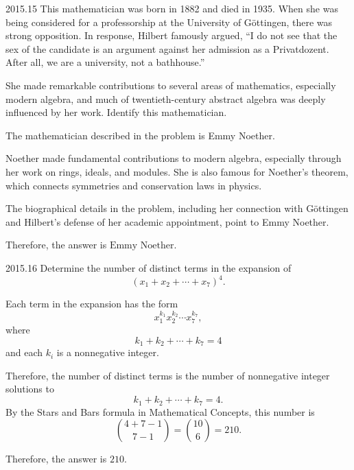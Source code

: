     \begin{pastproblem}{2015.15}
        This mathematician was born in 1882 and died in 1935. When she was being considered for a
        professorship at the University of Göttingen, there was strong opposition. In response,
        Hilbert famously argued, ``I do not see that the sex of the candidate is an argument against
        her admission as a Privatdozent. After all, we are a university, not a bathhouse.''

        She made remarkable contributions to several areas of mathematics, especially modern
        algebra, and much of twentieth-century abstract algebra was deeply influenced by her work.
        Identify this mathematician.
    \end{pastproblem}

    \begin{solution}
        The mathematician described in the problem is Emmy Noether.

        Noether made fundamental contributions to modern algebra, especially through her work on
        rings, ideals, and modules. She is also famous for Noether's theorem, which connects
        symmetries and conservation laws in physics.

        The biographical details in the problem, including her connection with Göttingen and
        Hilbert's defense of her academic appointment, point to Emmy Noether.

        Therefore, the answer is $\boxed{\text{Emmy Noether}}$.
    \end{solution}

    \begin{pastproblem}{2015.16}
        Determine the number of distinct terms in the expansion of
        \[
            (x_1+x_2+\cdots+x_7)^4.
        \]
    \end{pastproblem}

    \begin{solution}
        Each term in the expansion has the form
        \[
            x_1^{k_1}x_2^{k_2}\cdots x_7^{k_7},
        \]
        where
        \[
            k_1+k_2+\cdots+k_7=4
        \]
        and each $k_i$ is a nonnegative integer.

        Therefore, the number of distinct terms is the number of nonnegative integer solutions to
        \[
            k_1+k_2+\cdots+k_7=4.
        \]
        By the Stars and Bars formula in Mathematical Concepts, this number is
        \[
            \binom{4+7-1}{7-1}
            =
            \binom{10}{6}
            =
            210.
        \]

        Therefore, the answer is $\boxed{210}$.
    \end{solution}

